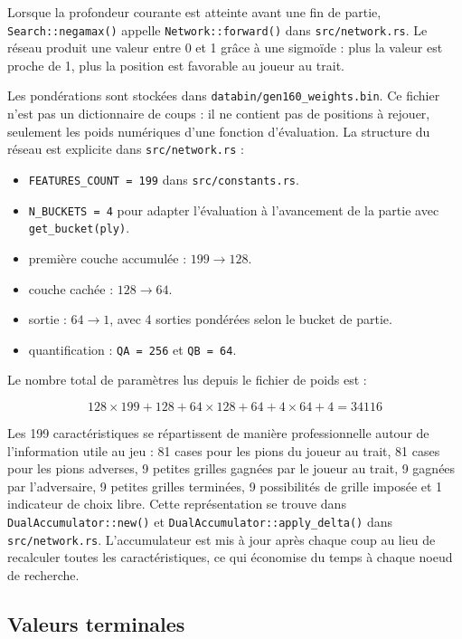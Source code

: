 \documentclass{pssbmac}
\begin{document}
Lorsque la profondeur courante est atteinte avant une fin de partie, \texttt{Search::negamax()} appelle \texttt{Network::forward()} dans \texttt{src/network.rs}. Le réseau produit une valeur entre 0 et 1 grâce à une sigmoïde : plus la valeur est proche de 1, plus la position est favorable au joueur au trait.

Les pondérations sont stockées dans \texttt{databin/gen160\_weights.bin}. Ce fichier n'est pas un dictionnaire de coups : il ne contient pas de positions à rejouer, seulement les poids numériques d'une fonction d'évaluation. La structure du réseau est explicite dans \texttt{src/network.rs} :

\begin{itemize}
    \item \texttt{FEATURES\_COUNT = 199} dans \texttt{src/constants.rs}.
    \item \texttt{N\_BUCKETS = 4} pour adapter l'évaluation à l'avancement de la partie avec \texttt{get\_bucket(ply)}.
    \item première couche accumulée : \(199 \rightarrow 128\).
    \item couche cachée : \(128 \rightarrow 64\).
    \item sortie : \(64 \rightarrow 1\), avec 4 sorties pondérées selon le bucket de partie.
    \item quantification : \texttt{QA = 256} et \texttt{QB = 64}.
\end{itemize}

Le nombre total de paramètres lus depuis le fichier de poids est :

\[
128 \times 199 + 128 + 64 \times 128 + 64 + 4 \times 64 + 4 = 34116
\]

Les 199 caractéristiques se répartissent de manière professionnelle autour de l'information utile au jeu : 81 cases pour les pions du joueur au trait, 81 cases pour les pions adverses, 9 petites grilles gagnées par le joueur au trait, 9 gagnées par l'adversaire, 9 petites grilles terminées, 9 possibilités de grille imposée et 1 indicateur de choix libre. Cette représentation se trouve dans \texttt{DualAccumulator::new()} et \texttt{DualAccumulator::apply\_delta()} dans \texttt{src/network.rs}. L'accumulateur est mis à jour après chaque coup au lieu de recalculer toutes les caractéristiques, ce qui économise du temps à chaque noeud de recherche.

\subsection{Valeurs terminales}
\end{document}
